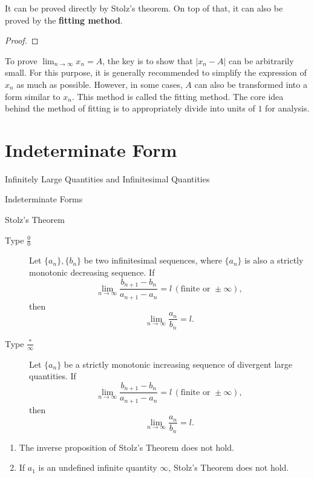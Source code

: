 \documentclass[11pt]{elegantbook}
\begin{document}
It can be proved directly by Stolz's theorem.
On top of that, it can also be proved by the \textbf{fitting method}.
\begin{proof}
    
\end{proof}

\begin{remark}
    To prove \(\lim_{n \to \infty} x_n = A\), 
    the key is to show that \(|x_n - A|\) can be arbitrarily small. 
    For this purpose, it is generally recommended to simplify the expression of \(x_n\) as much as possible. 
    However, in some cases, \(A\) can also be transformed into a form similar to \(x_n\). 
    This method is called the fitting method. 
    The core idea behind the method of fitting is to appropriately divide into units of \(1\) for analysis.
\end{remark}



\section{Indeterminate Form}
\begin{leftbarTitle}{Infinitely Large Quantities and Infinitesimal Quantities}\end{leftbarTitle}

\begin{leftbarTitle}{Indeterminate Forms}\end{leftbarTitle}

\begin{theorem}{Stolz's Theorem}
    \begin{description}
        \item[Type \(\frac{0}{0}\)] Let \(\{a_n\}, \{b_n\}\) be two infinitesimal sequences, 
            where \(\{a_n\}\) is also a strictly monotonic decreasing sequence. If  
            \[
            \lim_{n \to \infty} \frac{b_{n+1} - b_n}{a_{n+1} - a_n} = l \, (\text{finite or } \pm\infty),
            \]  
            then  
            \[
            \lim_{n \to \infty} \frac{a_n}{b_n} = l.
            \] 
        \item[Type \(\frac{\text{*}}{\infty}\)] Let \(\{a_n\}\) be a strictly monotonic increasing sequence 
            of divergent large quantities. If  
            \[
            \lim_{n \to \infty} \frac{b_{n+1} - b_n}{a_{n+1} - a_n} = l \, (\text{finite or } \pm\infty),
            \]  
            then  
            \[
            \lim_{n \to \infty} \frac{a_n}{b_n} = l.
            \]
    \end{description}
\end{theorem}
\begin{note}
    \begin{enumerate}
        \item The inverse proposition of Stolz's Theorem does not hold.
        \item If \(a_1\) is an undefined infinite quantity \(\infty\), Stolz's Theorem does not hold.
    \end{enumerate}
\end{note}
\end{document}
